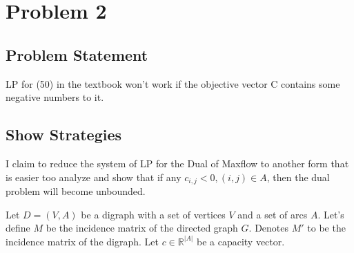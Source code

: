 \documentclass[]{article}
\theoremstyle{definition}
\begin{document}
\section{Problem 2}
    \subsection{Problem Statement}
        LP for (50) in the textbook won't work if the objective vector C contains some negative numbers to it. 
    \subsection{Show Strategies}
        I claim to reduce the system of LP  for the Dual of Maxflow to another form that is easier too analyze and show that if any $c_{i, j} < 0, (i, j)\in A$, then the dual problem will become unbounded. 
        \par
        Let $D = (V, A)$ be a digraph with a set of vertices $V$ and a set of arcs $A$. Let's define $M$ be the incidence matrix of the directed graph $G$. Denotes $M'$ to be the incidence matrix of the digraph. Let $c\in \mathbb R^{|A|}$ be a capacity vector. 
\end{document}
